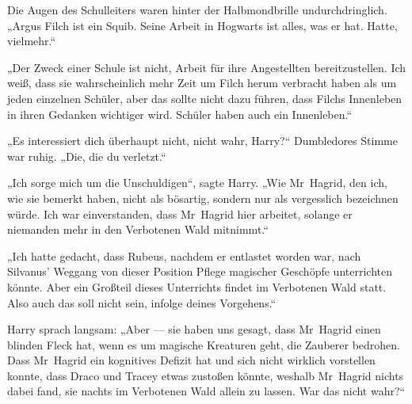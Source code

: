 Die Augen des Schulleiters waren hinter der Halbmondbrille undurchdringlich.
„Argus Filch ist ein Squib. Seine Arbeit in Hogwarts ist alles, was er hat. Hatte, vielmehr.“

„Der Zweck einer Schule ist nicht, Arbeit für ihre Angestellten bereitzustellen. Ich weiß, dass sie wahrscheinlich mehr Zeit um Filch herum verbracht haben als um jeden einzelnen Schüler, aber das sollte nicht dazu führen, dass Filchs Innenleben in ihren Gedanken wichtiger wird. Schüler haben auch ein Innenleben.“

„Es interessiert dich überhaupt nicht, nicht wahr, Harry?“ Dumbledores Stimme war ruhig.
„Die, die du verletzt.“

„Ich sorge mich um die Unschuldigen“, sagte Harry.
„Wie Mr~Hagrid, den ich, wie sie bemerkt haben, nicht als bösartig, sondern nur als vergesslich bezeichnen würde. Ich war einverstanden, dass Mr~Hagrid hier arbeitet, solange er niemanden mehr in den Verbotenen Wald mitnimmt.“

„Ich hatte gedacht, dass Rubeus, nachdem er entlastet worden war, nach Silvanus' Weggang von dieser Position Pflege magischer Geschöpfe unterrichten könnte. Aber ein Großteil dieses Unterrichts findet im Verbotenen Wald statt. Also auch das soll nicht sein, infolge deines Vorgehens.“

Harry sprach langsam:
„Aber — sie haben uns gesagt, dass Mr~Hagrid einen blinden Fleck hat, wenn es um magische Kreaturen geht, die Zauberer bedrohen. Dass Mr~Hagrid ein kognitives Defizit hat und sich nicht wirklich vorstellen konnte, dass Draco und Tracey etwas zustoßen könnte, weshalb Mr~Hagrid nichts dabei fand, sie nachts im Verbotenen Wald allein zu lassen. War das nicht wahr?“

